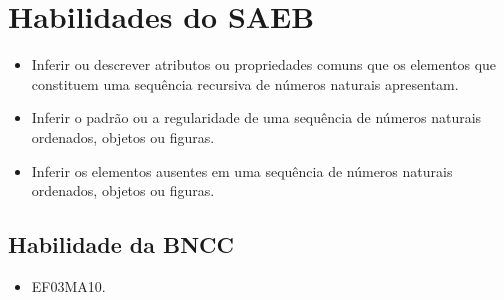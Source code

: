 \section*{Habilidades do SAEB}

\begin{itemize}
\item Inferir ou descrever atributos ou propriedades comuns que os elementos
que constituem uma sequência recursiva de números naturais apresentam.

\item Inferir o padrão ou a regularidade de uma sequência de números
naturais ordenados, objetos ou figuras.

\item Inferir os elementos ausentes em uma sequência de números naturais
ordenados, objetos ou figuras.
\end{itemize}

\subsection{Habilidade da BNCC}

\begin{itemize}
\item EF03MA10.
\end{itemize}

